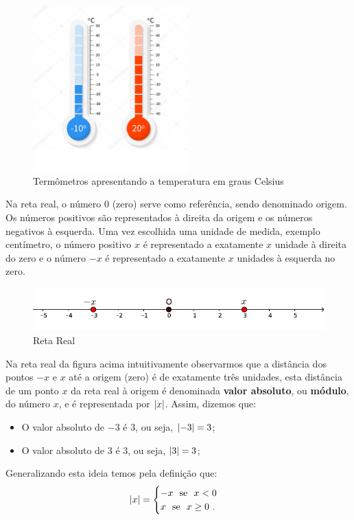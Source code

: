  \begin{figure}[H]
 \centering
 \includegraphics[width=6cm]{./cap_conjnum/figs/Termometro}
 \caption{Termômetros apresentando a temperatura em graus Celsius}
 \end{figure}

 Na reta real, o número $0$ (zero) serve como referência, sendo denominado origem. Os números positivos são representados à direita da origem e os números negativos à esquerda. Uma vez escolhida uma unidade de medida, exemplo centímetro, o número positivo $x$ é representado a exatamente $x$ unidade à direita do zero e o número $-x$ é representado a exatamente $x$ unidades à esquerda no zero.

  \begin{figure}[H]
 \centering
 \includegraphics[width=15cm]{./cap_conjnum/figs/RetaReal}
 \caption{Reta Real}
 \end{figure}

 Na reta real da figura acima intuitivamente observarmos que a distância dos pontos $-x$ e $x$ até a origem (zero) é de exatamente três unidades, esta distância de um ponto $x$ da reta real à origem é denominada \textbf{valor absoluto}, ou \textbf{módulo}, do número $x$, e é representada por $\left|x\right|$. Assim, dizemos que:
\begin{itemize}
\item O valor absoluto de $-3$ é $3$, ou seja, $\left|-3\right|= 3$;
\item O valor absoluto de $3$ é $3$, ou seja, $\left|3\right|= 3$;
\end{itemize}
Generalizando esta ideia temos pela definição que:
\[
\left|x\right|= \begin{cases}
      -x \ \ \text{se} \ \ x<0 \\
      x \ \ \text{se} \ \ x \geq 0 \ .
     \end{cases}
\]

